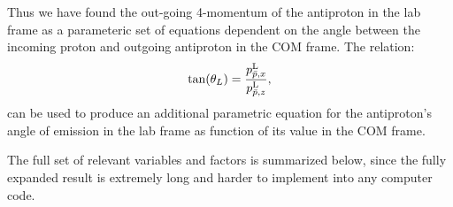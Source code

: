 Thus we have found the out-going 4-momentum of the antiproton in the lab frame as a parameteric set of equations dependent on the angle between the incoming proton and outgoing antiproton in the \ac{COM} frame.
The relation:
\begin{align}
\tan(\theta_L)=\frac{p^{\textrm{L}}_{\bar{p},x}}{p^{\textrm{L}}_{\bar{p},z}},
\end{align}
can be used to produce an additional parametric equation for the antiproton's angle of emission in the lab frame as function of its value in the COM frame.

The full set of relevant variables and factors is summarized below, since the fully expanded result is extremely long and harder to implement into any computer code.
%
